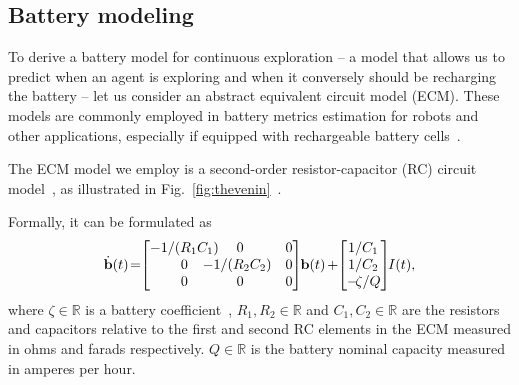 \documentclass[letterpaper,10pt,conference,twoside]{IEEEtran}
\theoremstyle{definition}
\begin{document}
\subsection{Battery modeling}\label{sec:batt}
\noindent
To derive a battery model for continuous exploration -- a model that allows us to predict when an agent is exploring and when it conversely should be recharging the battery -- let us consider an abstract equivalent circuit model (ECM). These models are commonly employed in battery metrics estimation for robots and other applications, especially if equipped with rechargeable battery cells~\cite{zhang2018online,xiaosong2012comparative,hasan2018exogenous,hinz2019comparison,mousavi2014various,seewald2022energy}.

The ECM model we employ is a second-order resistor-capacitor (RC) circuit model~\cite{zhao2017observability}, as illustrated in Fig.~\ref{fig:thevenin}~\cite{seewaldphdthesis}. 

Formally, it can be formulated as
\begin{equation}\label{eq:battmodel}
  \dot{\mathbf{b}}(t)\hspace*{-.4ex}=\hspace*{-.7ex}\begin{bmatrix}-1/(R_1C_1)\hspace*{-2ex}&\hspace*{-2ex}0&0\\\hspace*{2ex}0&\hspace*{-3ex}-1/(R_2C_2)&0\\\hspace*{2ex}0&\hspace*{-2ex}0&0\end{bmatrix}\hspace*{-.6ex}\mathbf{b}(t)\hspace*{-.2ex}+\hspace*{-.6ex}\begin{bmatrix}\hspace*{-.2ex}1/C_1\\\hspace*{-.2ex}1/C_2\\-\hspace*{-.4ex}\zeta/Q\end{bmatrix}\hspace*{-.7ex}I(t),
\end{equation}
where $\zeta\in\mathbb{R}$ is a battery coefficient~\cite{seewald2022energy}, $R_1,R_2\in\mathbb{R}$ and $C_1,C_2\in\mathbb{R}$ are the resistors and capacitors relative to the first and second RC elements in the ECM measured in ohms and farads respectively.
$Q\in\mathbb{R}$ is the battery nominal capacity measured in amperes per hour.
\end{document}
